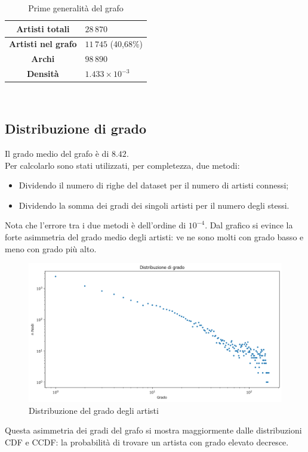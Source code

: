 \documentclass[sigchi]{acmart}
\begin{document}
\begin{table}[H]
\centering
\small
\begin{tabular}{|c|>{\raggedright\arraybackslash}p{4cm}|}
\hline
\textbf{Artisti totali} &
$ 28\,870 $ \\
\hline
\textbf{Artisti nel grafo} &
$ 11\,745 $ (40,68\%)  \\
\hline
\textbf{Archi} &
$ 98\,890 $ \\
\hline
\textbf{Densità} &
$ 1.433 \times 10^{-3} $ \\
\hline
\end{tabular}\\[15pt]
\caption{Prime generalità del grafo}
\end{table}

\subsection{Distribuzione di grado}

Il grado medio del grafo è di $ 8.42 $. \\ Per calcolarlo sono stati utilizzati, per completezza, due metodi:

\begin{itemize}
\item Dividendo il numero di righe del dataset per il numero di artisti connessi;
\item Dividendo la somma dei gradi dei singoli artisti per il numero degli stessi.
\end{itemize}
Nota che l'errore tra i due metodi è dell'ordine di $ 10^{-4} $. Dal grafico si evince la forte asimmetria del grado medio degli artisti: ve ne sono molti con grado basso e meno con grado più alto.

\begin{figure}[H]
\centering
\includegraphics[width=0.45
\textwidth]{../network_analysis/plots/2_2/grDist.png}
\caption{Distribuzione del grado degli artisti}
\label{fig:grDist}
\end{figure}

\noindent Questa asimmetria dei gradi del grafo si mostra maggiormente dalle distribuzioni CDF e CCDF: la probabilità di trovare un artista con grado elevato decresce.
\end{document}
